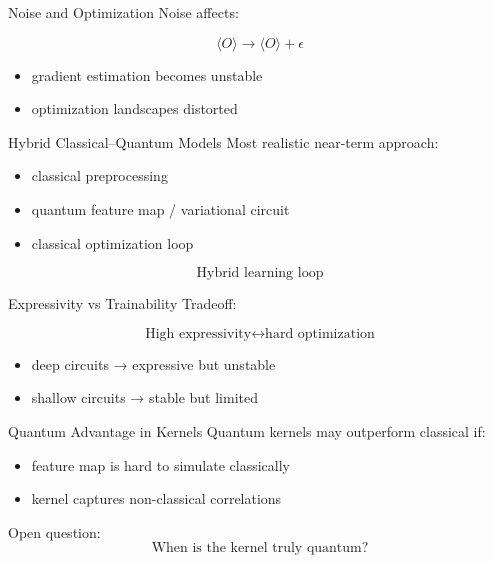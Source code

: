 \documentclass{beamer}
\begin{document}
\begin{frame}{Noise and Optimization}
Noise affects:

\[
\langle O \rangle \rightarrow \langle O \rangle + \epsilon
\]

\begin{itemize}
\item gradient estimation becomes unstable
\item optimization landscapes distorted
\end{itemize}
\end{frame}

\begin{frame}{Hybrid Classical–Quantum Models}
Most realistic near-term approach:

\begin{itemize}
\item classical preprocessing
\item quantum feature map / variational circuit
\item classical optimization loop
\end{itemize}

\medskip

\[
\text{Hybrid learning loop}
\]
\end{frame}

\begin{frame}{Expressivity vs Trainability}
Tradeoff:

\[
\text{High expressivity} \leftrightarrow \text{hard optimization}
\]

\begin{itemize}
\item deep circuits → expressive but unstable
\item shallow circuits → stable but limited
\end{itemize}
\end{frame}

\begin{frame}{Quantum Advantage in Kernels}
Quantum kernels may outperform classical if:

\begin{itemize}
\item feature map is hard to simulate classically
\item kernel captures non-classical correlations
\end{itemize}

\medskip

Open question:
\[
\text{When is the kernel truly quantum?}
\]
\end{frame}
\end{document}
